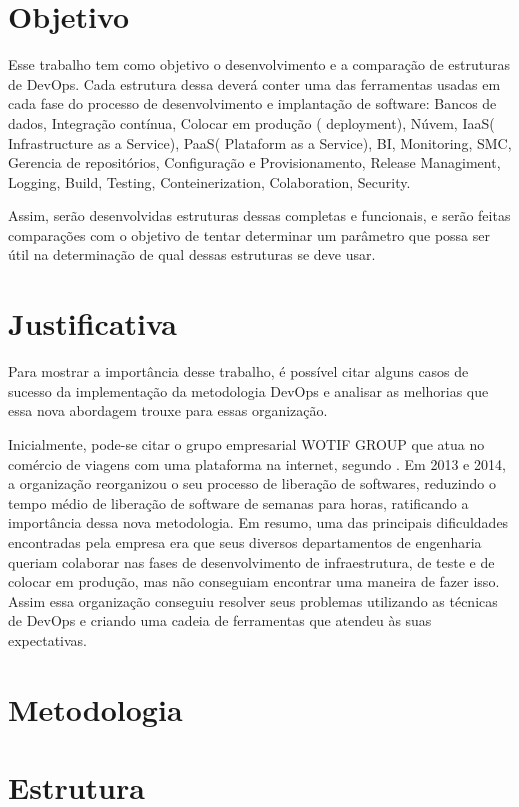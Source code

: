 \section{Objetivo}

Esse trabalho tem como objetivo o desenvolvimento e a 
comparação de estruturas de DevOps. Cada estrutura dessa 
deverá conter uma das ferramentas usadas em cada fase do 
processo de desenvolvimento e implantação de software: 
Bancos de dados, Integração contínua, Colocar em produção
( deployment), Núvem, IaaS( Infrastructure as a Service),
PaaS( Plataform as a Service), BI, Monitoring, SMC, 
Gerencia de repositórios, Configuração e Provisionamento, 
Release Managiment, Logging, Build, Testing, Conteinerization, 
Colaboration, Security.

Assim, serão desenvolvidas estruturas dessas completas e 
funcionais, e serão feitas comparações com o objetivo de 
tentar determinar um parâmetro que possa ser útil na 
determinação de qual dessas estruturas se deve usar.

\section{Justificativa}

Para mostrar a importância desse trabalho, é possível citar 
alguns casos de sucesso da implementação da metodologia DevOps 
e analisar as melhorias que essa nova abordagem trouxe 
para essas organização.

Inicialmente, pode-se citar o grupo empresarial WOTIF GROUP que 
atua no comércio de viagens com uma plataforma na internet, 
segundo \cite{callanandevops}. Em 2013 e 2014, a organização 
reorganizou o seu processo de liberação de softwares, reduzindo 
o tempo médio de liberação de software de semanas para horas, 
ratificando a importância dessa nova metodologia. Em resumo, 
uma das principais dificuldades encontradas pela empresa era 
que seus diversos departamentos de engenharia queriam colaborar 
nas fases de desenvolvimento de infraestrutura, de teste e de 
colocar em produção, mas não conseguiam encontrar uma maneira 
de fazer isso. Assim essa organização conseguiu resolver seus 
problemas utilizando as técnicas de DevOps e criando uma cadeia 
de ferramentas que atendeu às suas expectativas.


\section{Metodologia}

\section{Estrutura}